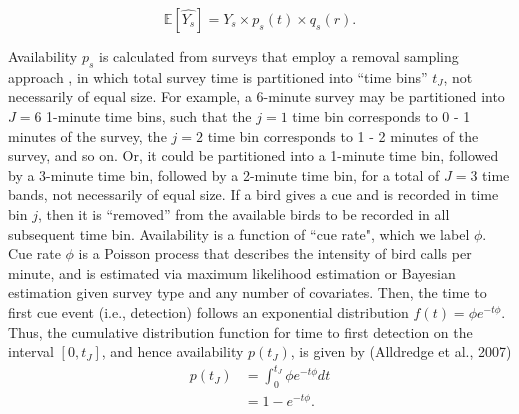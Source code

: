 \begin{equation*}
	\mathbb{E}\left[\hat{Y_s}\right] = Y_s \times p_s(t) \times q_s(r).
\end{equation*}

\par Availability $p_s$ is calculated from surveys that employ a removal sampling approach \citep{alldredge_time--detection_2007, farnsworth_removal_2002, solymos_evaluating_2018}, in which total survey time is partitioned into “time bins” $t_J$, not necessarily of equal size. 
For example, a 6-minute survey may be partitioned into $J = 6$ 1-minute time bins, such that the $j = 1$ time bin corresponds to 0 - 1 minutes of the survey, the $j = 2$ time bin corresponds to 1 - 2 minutes of the survey, and so on.
Or, it could be partitioned into a 1-minute time bin, followed by a 3-minute time bin, followed by a 2-minute time bin, for a total of $J = 3$ time bands, not necessarily of equal size. 
If a bird gives a cue and is recorded in time bin $j$, then it is ``removed” from the available birds to be recorded in all subsequent time bin. 
Availability is a function of ``cue rate", which we label $\phi$.
Cue rate $\phi$ is a Poisson process that describes the intensity of bird calls per minute, and is estimated via maximum likelihood estimation or Bayesian estimation given survey type and any number of covariates. 
Then, the time to first cue event (i.e., detection) follows an exponential distribution $f(t) = \phi e^{-t\phi}$. 
Thus, the cumulative distribution function for time to first detection on the interval $\left[0, t_J\right]$, and hence availability $p(t_J)$, is given by (Alldredge et al., 2007)
\begin{align*}
	p(t_J) &= \int_{0}^{t_J} \phi e^{-t\phi} dt \\
	&= 1 - e^{-t\phi}.
\end{align*}


